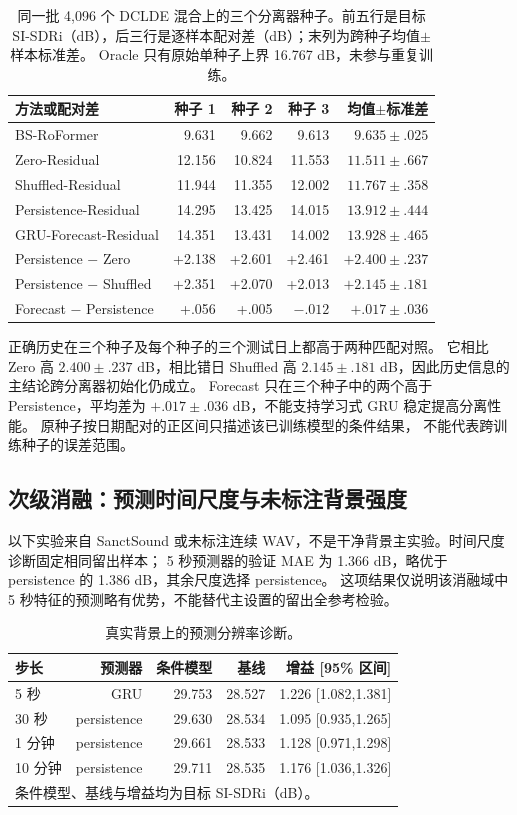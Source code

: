 \documentclass[conference]{IEEEtran}
\begin{document}
\begin{table}[t]
\caption{同一批 4,096 个 DCLDE 混合上的三个分离器种子。前五行是目标
SI-SDRi（dB），后三行是逐样本配对差（dB）；末列为跨种子均值$\pm$样本标准差。
Oracle 只有原始单种子上界 16.767 dB，未参与重复训练。}
\label{tab:seeds}\centering\footnotesize
\begin{tabular}{lrrrr}
\toprule
方法或配对差 & 种子 1 & 种子 2 & 种子 3 & 均值$\pm$标准差\\
\midrule
BS-RoFormer & 9.631 & 9.662 & 9.613 & $9.635\pm.025$\\
Zero-Residual & 12.156 & 10.824 & 11.553 & $11.511\pm.667$\\
Shuffled-Residual & 11.944 & 11.355 & 12.002 & $11.767\pm.358$\\
Persistence-Residual & 14.295 & 13.425 & 14.015 & $13.912\pm.444$\\
GRU-Forecast-Residual & 14.351 & 13.431 & 14.002 & $13.928\pm.465$\\
\midrule
Persistence $-$ Zero & +2.138 & +2.601 & +2.461 & $+2.400\pm.237$\\
Persistence $-$ Shuffled & +2.351 & +2.070 & +2.013 & $+2.145\pm.181$\\
Forecast $-$ Persistence & +.056 & +.005 & $-.012$ & $+.017\pm.036$\\
\bottomrule
\end{tabular}
\end{table}

正确历史在三个种子及每个种子的三个测试日上都高于两种匹配对照。
它相比 Zero 高 $2.400\pm.237$ dB，相比错日 Shuffled 高
$2.145\pm.181$ dB，因此历史信息的主结论跨分离器初始化仍成立。
Forecast 只在三个种子中的两个高于 Persistence，平均差为
$+.017\pm.036$ dB，不能支持学习式 GRU 稳定提高分离性能。
原种子按日期配对的正区间只描述该已训练模型的条件结果，
不能代表跨训练种子的误差范围。

\subsection{次级消融：预测时间尺度与未标注背景强度}
以下实验来自 SanctSound 或未标注连续 WAV，不是干净背景主实验。时间尺度诊断固定相同留出样本；
5 秒预测器的验证 MAE 为 1.366 dB，略优于 persistence 的 1.386 dB，其余尺度选择 persistence。
这项结果仅说明该消融域中 5 秒特征的预测略有优势，不能替代主设置的留出全参考检验。

\begin{table}[t]
\caption{真实背景上的预测分辨率诊断。}
\label{tab:windows}\centering\footnotesize
\begin{tabular}{lrrrr}
\toprule
步长 & 预测器 & 条件模型 & 基线 & 增益 [95\% 区间]\\
\midrule
5 秒 &GRU&29.753&28.527&1.226 [1.082,1.381]\\
30 秒&persistence&29.630&28.534&1.095 [0.935,1.265]\\
1 分钟&persistence&29.661&28.533&1.128 [0.971,1.298]\\
10 分钟&persistence&29.711&28.535&1.176 [1.036,1.326]\\
\bottomrule
\multicolumn{5}{l}{\scriptsize 条件模型、基线与增益均为目标 SI-SDRi（dB）。}
\end{tabular}
\end{table}
\end{document}
